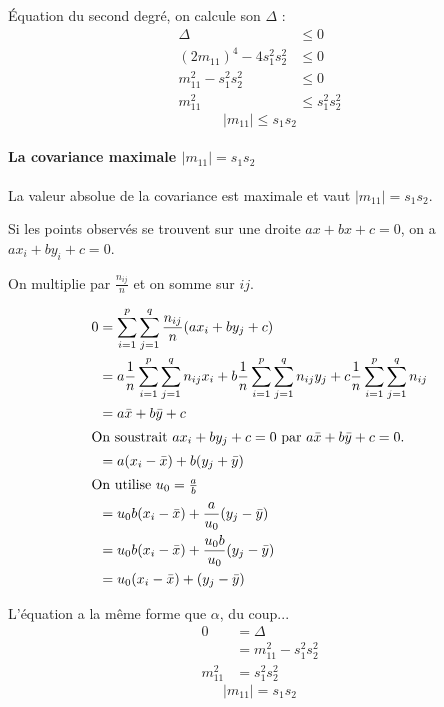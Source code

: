 Équation du second degré, on calcule son $\Delta$ :
\begin{align*}
	\Delta &\leq 0\\
	(2 m_{11})^4 - 4 s_1^2 s_2^2 &\leq 0\\
	m_{11}^2 - s_1^2 s_2^2 &\leq 0\\
	m_{11}^2 &\leq s_1^2 s_2^2
\end{align*}
$$\boxed{|m_{11}| \leq s_1 s_2}$$




\paragraph{La covariance maximale $|m_{11}| = s_1s_2$}

La valeur absolue de la covariance est maximale et vaut $|m_{11}| = s_1s_2$.

Si les points observés se trouvent sur une droite $ax+bx+c=0$, on a $ax_i+by_i+c=0$.

On multiplie par $\frac{n_{ij}}{n}$ et on somme sur $ij$.

\begin{align*}
0  &= \sum_{i=1}^{p} \sum_{j=1}^{q} \frac{n_{ij}}{n}(ax_i+by_j+c) \\
   &= a \frac{1}{n} \sum_{i=1}^{p} \sum_{j=1}^{q}n_{ij}x_i + b \frac{1}{n} \sum_{i=1}^{p} \sum_{j=1}^{q}n_{ij}y_j + c \frac{1}{n} \sum_{i=1}^{p} \sum_{j=1}^{q}n_{ij}\\
   &= a\bar{x}+b\bar{y}+c\\
\intertext{On soustrait $ax_i+by_j+c=0$ par $a\bar{x}+b\bar{y}+c = 0$.}
   &= a(x_i-\bar{x})+b(y_j+\bar{y})\\
\intertext{On utilise $u_0=\frac{a}{b}$}
   &= u_0b(x_i-\bar{x})+\frac{a}{u_0}(y_j-\bar{y})\\
   &= u_0b(x_i-\bar{x})+\frac{u_0b}{u_0}(y_j-\bar{y})\\
   &= u_0(x_i-\bar{x})+(y_j-\bar{y})
\end{align*}

L'équation a la même forme que $\alpha$, du coup...
\begin{align*}
	0        &= \Delta\\
	         &= m_{11}^2-s_1^2s_2^2\\
	m_{11}^2 &= s_1^2s_2^2
\end{align*}
$$\boxed{|m_{11}| = s_1s_2}$$









